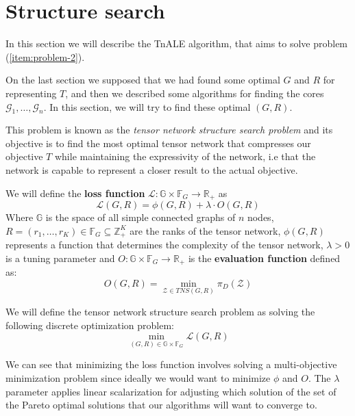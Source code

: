 \documentclass[11pt,a4paper,openright,oneside]{book}
\numberwithin{equation}{section}
\begin{document}
{\section{Structure search}

In this section we will describe the TnALE algorithm, that aims to solve problem (\ref{item:problem-2}).

On the last section we supposed that we had found some optimal $G$ and $R$ for representing $T$, and then we 
described some algorithms for finding the cores $\mathcal{G}_1, \dots, \mathcal{G}_n$. In this section,
we will try to find these optimal $(G, R)$.

This problem is known as the \textit{tensor network structure search problem} and its objective 
is to find the most optimal tensor network that 
compresses our objective $T$ while maintaining the expressivity of the network, i.e that the network
is capable to represent a closer result to the actual objective. 

We will define the \textbf{loss function} $\mathcal{L}: \mathbb{G} \times \mathbb{F}_G \rightarrow \mathbb{R}_+$ as
$$\mathcal{L}(G,R) = \phi(G, R) + \lambda \cdot O(G, R) $$
Where $\mathbb{G}$ is the space of all simple connected graphs of $n$ nodes, ${R = (r_1, \dots, r_K) \in \mathbb{F}_G \subseteq
\mathbb{Z}_+^K}$ are the ranks of the tensor network, $\phi(G, R)$ represents a function that determines the complexity of the
tensor network, $\lambda > 0$ is a tuning parameter and $O: \mathbb{G} \times \mathbb{F}_G \rightarrow \mathbb{R}_+$ is the 
\textbf{evaluation function} defined as:
\begin{equation}
    O(G, R) = \min_{\mathcal{Z} \in TNS(G,R)} \pi_D (\mathcal{Z})
    \label{eq:tnale-min-obj}
\end{equation}

We will define the tensor network structure search problem as solving the following discrete optimization problem:
\begin{equation}
    \min_{(G, R) \in \mathbb{G} \times \mathbb{F}_G} \mathcal{L}(G, R)
\label{eq:tnss}
\end{equation}

We can see that minimizing the loss function involves solving a multi-objective minimization problem
since ideally we would want to minimize $\phi$ and $O$. The $\lambda$ parameter applies linear scalarization
for adjusting which solution of the set of the Pareto optimal solutions that our algorithms will want to converge to.

}
\end{document}
